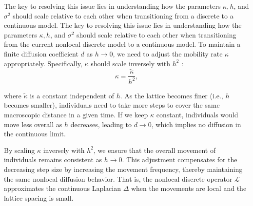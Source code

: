 \documentclass[sn-basic]{sn-jnl}%
\theoremstyle{thmstyleone}%
\theoremstyle{thmstyletwo}%
\theoremstyle{thmstylethree}%
\numberwithin{equation}{theorem}
\begin{document}
The key to resolving this issue lies in understanding how the parameters $\kappa, h$, and $\sigma^2$ should scale relative to each other when transitioning from a discrete to a continuous model. The key to resolving this issue lies in understanding how the parameters $\kappa, h$, and $\sigma^2$ should scale relative to each other when transitioning from the current nonlocal discrete model to a continuous model. To maintain a finite diffusion coefficient $d$ as $h \rightarrow 0$, we need to adjust the mobility rate $\kappa$ appropriately. Specifically, $\kappa$ should scale inversely with $h^2$ :
$$
\kappa=\frac{\tilde{\kappa}}{h^2},
$$

where $\tilde{\kappa}$ is a constant independent of $h$. As the lattice becomes finer (i.e., $h$ becomes smaller), individuals need to take more steps to cover the same macroscopic distance in a given time. If we keep $\kappa$ constant, individuals would move less overall as $h$ decreases, leading to $d \rightarrow 0$, which implies no diffusion in the continuous limit.

By scaling $\kappa$ inversely with $h^2$, we ensure that the overall movement of individuals remains consistent as $h \rightarrow 0$. This adjustment compensates for the decreasing step size by increasing the movement frequency, thereby maintaining the same nonlocal diffusion behavior. That is, the nonlocal discrete operator $\mathcal{L}$ approximates the continuous Laplacian $\Delta$ when the movements are local and the lattice spacing is small. 
\end{document}

